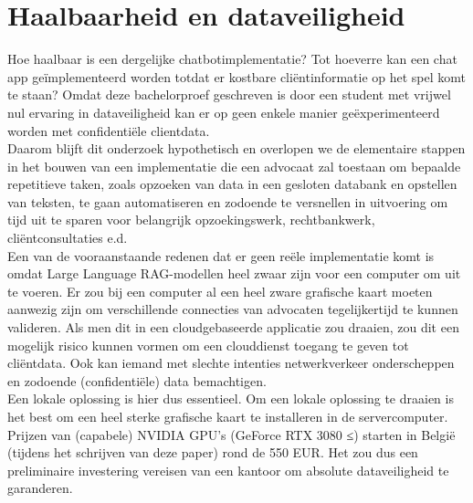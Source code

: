 \chapter{Haalbaarheid en dataveiligheid}
\label{ch:feasability}
Hoe haalbaar is een dergelijke chatbotimplementatie? 
Tot hoeverre kan een chat app geïmplementeerd worden totdat er kostbare cliëntinformatie op het spel komt te staan? 
Omdat deze bachelorproef geschreven is door een student met vrijwel nul ervaring in dataveiligheid kan er op geen enkele manier geëxperimenteerd worden met confidentiële clientdata. \\ 

Daarom blijft dit onderzoek hypothetisch en overlopen we de elementaire stappen in het bouwen van een implementatie die een advocaat zal toestaan om bepaalde repetitieve taken, 
zoals opzoeken van data in een gesloten databank en opstellen van teksten, te gaan automatiseren en zodoende te versnellen in uitvoering om tijd uit te sparen voor belangrijk opzoekingswerk, 
rechtbankwerk, cliëntconsultaties e.d.\\ 

Een van de vooraanstaande redenen dat er geen reële implementatie komt is omdat Large Language RAG-modellen heel zwaar zijn voor een computer om uit te voeren. 
Er zou bij een computer al een heel zware grafische kaart moeten aanwezig zijn om verschillende connecties van advocaten tegelijkertijd te kunnen valideren. 
Als men dit in een cloudgebaseerde applicatie zou draaien, zou dit een mogelijk risico kunnen vormen om een clouddienst toegang te geven tot cliëntdata.
Ook kan iemand met slechte intenties netwerkverkeer onderscheppen en zodoende (confidentiële) data bemachtigen. \\ 

Een lokale oplossing is hier dus essentieel. 
Om een lokale oplossing te draaien is het best om een heel sterke grafische kaart te installeren in de servercomputer. 
Prijzen van (capabele) NVIDIA GPU's (GeForce RTX 3080 ≤) starten in België (tijdens het schrijven van deze paper) rond de 550 EUR. 
Het zou dus een preliminaire investering vereisen van een kantoor om absolute dataveiligheid te garanderen. 
